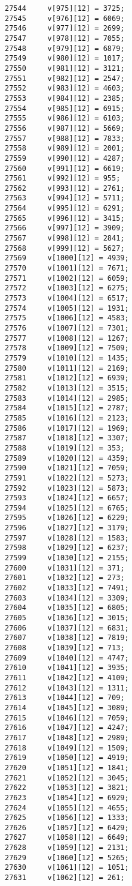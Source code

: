 \begin{Code}
\begin{verbatim}
27544     v[975][12] = 3725;
27545     v[976][12] = 6069;
27546     v[977][12] = 2699;
27547     v[978][12] = 7055;
27548     v[979][12] = 6879;
27549     v[980][12] = 1017;
27550     v[981][12] = 3121;
27551     v[982][12] = 2547;
27552     v[983][12] = 4603;
27553     v[984][12] = 2385;
27554     v[985][12] = 6915;
27555     v[986][12] = 6103;
27556     v[987][12] = 5669;
27557     v[988][12] = 7833;
27558     v[989][12] = 2001;
27559     v[990][12] = 4287;
27560     v[991][12] = 6619;
27561     v[992][12] = 955;
27562     v[993][12] = 2761;
27563     v[994][12] = 5711;
27564     v[995][12] = 6291;
27565     v[996][12] = 3415;
27566     v[997][12] = 3909;
27567     v[998][12] = 2841;
27568     v[999][12] = 5627;
27569     v[1000][12] = 4939;
27570     v[1001][12] = 7671;
27571     v[1002][12] = 6059;
27572     v[1003][12] = 6275;
27573     v[1004][12] = 6517;
27574     v[1005][12] = 1931;
27575     v[1006][12] = 4583;
27576     v[1007][12] = 7301;
27577     v[1008][12] = 1267;
27578     v[1009][12] = 7509;
27579     v[1010][12] = 1435;
27580     v[1011][12] = 2169;
27581     v[1012][12] = 6939;
27582     v[1013][12] = 3515;
27583     v[1014][12] = 2985;
27584     v[1015][12] = 2787;
27585     v[1016][12] = 2123;
27586     v[1017][12] = 1969;
27587     v[1018][12] = 3307;
27588     v[1019][12] = 353;
27589     v[1020][12] = 4359;
27590     v[1021][12] = 7059;
27591     v[1022][12] = 5273;
27592     v[1023][12] = 5873;
27593     v[1024][12] = 6657;
27594     v[1025][12] = 6765;
27595     v[1026][12] = 6229;
27596     v[1027][12] = 3179;
27597     v[1028][12] = 1583;
27598     v[1029][12] = 6237;
27599     v[1030][12] = 2155;
27600     v[1031][12] = 371;
27601     v[1032][12] = 273;
27602     v[1033][12] = 7491;
27603     v[1034][12] = 3309;
27604     v[1035][12] = 6805;
27605     v[1036][12] = 3015;
27606     v[1037][12] = 6831;
27607     v[1038][12] = 7819;
27608     v[1039][12] = 713;
27609     v[1040][12] = 4747;
27610     v[1041][12] = 3935;
27611     v[1042][12] = 4109;
27612     v[1043][12] = 1311;
27613     v[1044][12] = 709;
27614     v[1045][12] = 3089;
27615     v[1046][12] = 7059;
27616     v[1047][12] = 4247;
27617     v[1048][12] = 2989;
27618     v[1049][12] = 1509;
27619     v[1050][12] = 4919;
27620     v[1051][12] = 1841;
27621     v[1052][12] = 3045;
27622     v[1053][12] = 3821;
27623     v[1054][12] = 6929;
27624     v[1055][12] = 4655;
27625     v[1056][12] = 1333;
27626     v[1057][12] = 6429;
27627     v[1058][12] = 6649;
27628     v[1059][12] = 2131;
27629     v[1060][12] = 5265;
27630     v[1061][12] = 1051;
27631     v[1062][12] = 261;

\end{verbatim}
\end{Code}
